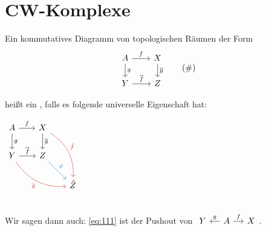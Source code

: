 \newpage

\section{CW-Komplexe} %
\label{sec:11}

\begin{definition}[{name=[Pushout]}]
	Ein kommutatives Diagramm von topologischen Räumen der Form
	\begin{equation*}
		\begin{tikzcd}[row sep=1.6em, column sep=2.1em]
			A \rar["f"] \dar["g"] & X \dar["\overline{g} "] \\
			Y \rar["\overline{f}"] & Z
		\end{tikzcd} \label{eq:111} \tag{\#}
	\end{equation*}
	\noindent\begin{minipage}{0.65\textwidth}
		heißt ein , falls es folgende universelle Eigenschaft hat: \smallskip\\
	\end{minipage}
	\hfill \begin{minipage}{0.3\textwidth}
		\hspace{2em}\(
			\begin{tikzcd}[sep=1.9em]
				A \rar["f"] \dar["g"] & X \dar["\overline{g}"] \arrow[ddr, "\hat{f}", bend left, Firebrick3] \\
				Y \rar["\overline{f}"] \arrow[drr, "\hat{g}"',bend right, Firebrick3] & Z  \drar["\varphi", DodgerBlue3] \\
				& & \hat{Z}
			\end{tikzcd}
		\)
	\end{minipage}\\[-1.2em]
	Wir sagen dann auch: \eqref{eq:111} ist der Pushout von 
	\(
		\begin{tikzcd}[sep=small]
			Y & A \rar["f"] \lar["g"']& X 
		\end{tikzcd}
	\).
\end{definition}

